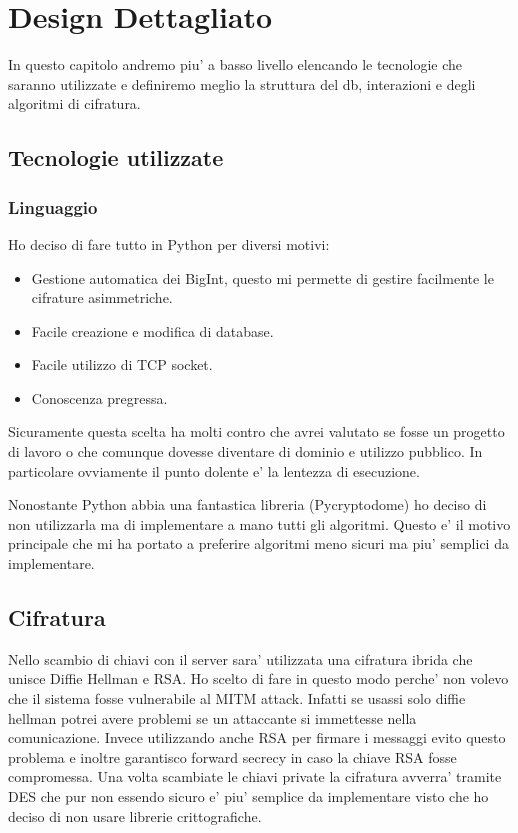 \chapter{Design Dettagliato}

In questo capitolo andremo piu' a basso livello elencando le tecnologie che saranno utilizzate e
definiremo meglio la struttura del db, interazioni e degli algoritmi di cifratura.

\section{Tecnologie utilizzate}

\subsection{Linguaggio}
Ho deciso di fare tutto in Python per diversi motivi:
\begin{itemize}
    \item Gestione automatica dei BigInt, questo mi permette di gestire facilmente le cifrature
    asimmetriche.
    \item Facile creazione e modifica di database.
    \item Facile utilizzo di TCP socket.
    \item Conoscenza pregressa.
\end{itemize}
Sicuramente questa scelta ha molti contro che avrei valutato se fosse un progetto di lavoro o che
comunque dovesse diventare di dominio e utilizzo pubblico. In particolare ovviamente il punto
dolente e' la lentezza di esecuzione.

Nonostante Python abbia una fantastica libreria (Pycryptodome) ho deciso di non utilizzarla ma di
implementare a mano tutti gli algoritmi. Questo e' il motivo principale che mi ha portato a
preferire algoritmi meno sicuri ma piu' semplici da implementare.

\section{Cifratura}

Nello scambio di chiavi con il server sara' utilizzata una cifratura ibrida che unisce Diffie Hellman e
RSA. Ho scelto di fare in questo modo perche' non volevo che il sistema fosse vulnerabile al MITM
attack. Infatti se usassi solo diffie hellman potrei avere problemi se un attaccante si immettesse
nella comunicazione. Invece utilizzando anche RSA per firmare i messaggi evito questo problema e
inoltre garantisco forward secrecy in caso la chiave RSA fosse compromessa. Una
volta scambiate le chiavi private la cifratura avverra' tramite DES che pur non essendo sicuro e'
piu' semplice da implementare visto che ho deciso di non usare librerie crittografiche.

